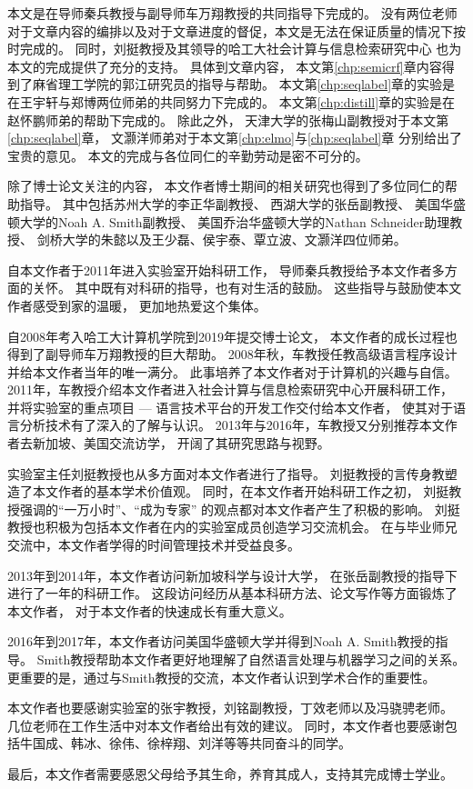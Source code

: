 \begin{acknowledgements}

本文是在导师秦兵教授与副导师车万翔教授的共同指导下完成的。
没有两位老师对于文章内容的编排以及对于文章进度的督促，本文是无法在保证质量的情况下按时完成的。
同时，刘挺教授及其领导的哈工大社会计算与信息检索研究中心
也为本文的完成提供了充分的支持。
具体到文章内容，
本文第\ref{chp:semicrf}章内容得到了麻省理工学院的郭江研究员的指导与帮助。
本文第\ref{chp:seqlabel}章的实验是在王宇轩与郑博两位师弟的共同努力下完成的。
本文第\ref{chp:distill}章的实验是在赵怀鹏师弟的帮助下完成的。
除此之外，
天津大学的张梅山副教授对于本文第\ref{chp:seqlabel}章，
文灏洋师弟对于本文第\ref{chp:elmo}与\ref{chp:seqlabel}章
分别给出了宝贵的意见。
本文的完成与各位同仁的辛勤劳动是密不可分的。

除了博士论文关注的内容，
本文作者博士期间的相关研究也得到了多位同仁的帮助指导。
其中包括苏州大学的李正华副教授、
西湖大学的张岳副教授、
美国华盛顿大学的Noah A. Smith副教授、
美国乔治华盛顿大学的Nathan Schneider助理教授、
剑桥大学的朱懿以及王少磊、侯宇泰、覃立波、文灏洋四位师弟。

自本文作者于2011年进入实验室开始科研工作，
导师秦兵教授给予本文作者多方面的关怀。
其中既有对科研的指导，也有对生活的鼓励。
这些指导与鼓励使本文作者感受到家的温暖，
更加地热爱这个集体。

自2008年考入哈工大计算机学院到2019年提交博士论文，
本文作者的成长过程也得到了副导师车万翔教授的巨大帮助。
2008年秋，车教授任教高级语言程序设计并给本文作者当年的唯一满分。
此事培养了本文作者对于计算机的兴趣与自信。
2011年，车教授介绍本文作者进入社会计算与信息检索研究中心开展科研工作，
并将实验室的重点项目 --- 语言技术平台的开发工作交付给本文作者，
使其对于语言分析技术有了深入的了解与认识。
2013年与2016年，车教授又分别推荐本文作者去新加坡、美国交流访学，
开阔了其研究思路与视野。

实验室主任刘挺教授也从多方面对本文作者进行了指导。
刘挺教授的言传身教塑造了本文作者的基本学术价值观。
同时，在本文作者开始科研工作之初，
刘挺教授强调的``一万小时''、``成为专家''
的观点都对本文作者产生了积极的影响。
刘挺教授也积极为包括本文作者在内的实验室成员创造学习交流机会。
在与毕业师兄交流中，本文作者学得的时间管理技术并受益良多。

2013年到2014年，本文作者访问新加坡科学与设计大学，
在张岳副教授的指导下进行了一年的科研工作。
这段访问经历从基本科研方法、论文写作等方面锻炼了本文作者，
对于本文作者的快速成长有重大意义。

2016年到2017年，本文作者访问美国华盛顿大学并得到Noah A. Smith教授的指导。
Smith教授帮助本文作者更好地理解了自然语言处理与机器学习之间的关系。
更重要的是，通过与Smith教授的交流，本文作者认识到学术合作的重要性。

本文作者也要感谢实验室的张宇教授，刘铭副教授，丁效老师以及冯骁骋老师。
几位老师在工作生活中对本文作者给出有效的建议。
同时，本文作者也要感谢包括牛国成、韩冰、徐伟、徐梓翔、刘洋等等共同奋斗的同学。

最后，本文作者需要感恩父母给予其生命，养育其成人，支持其完成博士学业。


\end{acknowledgements}
